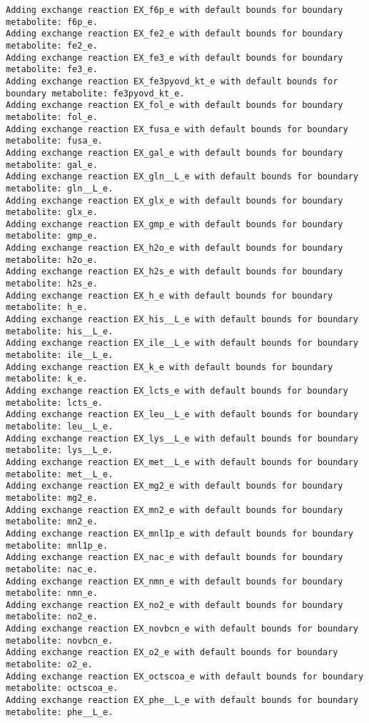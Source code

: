 \documentclass[
  letterpaper,
  DIV=11,
  numbers=noendperiod]{scrartcl}
\begin{document}
\begin{verbatim}
Adding exchange reaction EX_f6p_e with default bounds for boundary metabolite: f6p_e.
Adding exchange reaction EX_fe2_e with default bounds for boundary metabolite: fe2_e.
Adding exchange reaction EX_fe3_e with default bounds for boundary metabolite: fe3_e.
Adding exchange reaction EX_fe3pyovd_kt_e with default bounds for boundary metabolite: fe3pyovd_kt_e.
Adding exchange reaction EX_fol_e with default bounds for boundary metabolite: fol_e.
Adding exchange reaction EX_fusa_e with default bounds for boundary metabolite: fusa_e.
Adding exchange reaction EX_gal_e with default bounds for boundary metabolite: gal_e.
Adding exchange reaction EX_gln__L_e with default bounds for boundary metabolite: gln__L_e.
Adding exchange reaction EX_glx_e with default bounds for boundary metabolite: glx_e.
Adding exchange reaction EX_gmp_e with default bounds for boundary metabolite: gmp_e.
Adding exchange reaction EX_h2o_e with default bounds for boundary metabolite: h2o_e.
Adding exchange reaction EX_h2s_e with default bounds for boundary metabolite: h2s_e.
Adding exchange reaction EX_h_e with default bounds for boundary metabolite: h_e.
Adding exchange reaction EX_his__L_e with default bounds for boundary metabolite: his__L_e.
Adding exchange reaction EX_ile__L_e with default bounds for boundary metabolite: ile__L_e.
Adding exchange reaction EX_k_e with default bounds for boundary metabolite: k_e.
Adding exchange reaction EX_lcts_e with default bounds for boundary metabolite: lcts_e.
Adding exchange reaction EX_leu__L_e with default bounds for boundary metabolite: leu__L_e.
Adding exchange reaction EX_lys__L_e with default bounds for boundary metabolite: lys__L_e.
Adding exchange reaction EX_met__L_e with default bounds for boundary metabolite: met__L_e.
Adding exchange reaction EX_mg2_e with default bounds for boundary metabolite: mg2_e.
Adding exchange reaction EX_mn2_e with default bounds for boundary metabolite: mn2_e.
Adding exchange reaction EX_mnl1p_e with default bounds for boundary metabolite: mnl1p_e.
Adding exchange reaction EX_nac_e with default bounds for boundary metabolite: nac_e.
Adding exchange reaction EX_nmn_e with default bounds for boundary metabolite: nmn_e.
Adding exchange reaction EX_no2_e with default bounds for boundary metabolite: no2_e.
Adding exchange reaction EX_novbcn_e with default bounds for boundary metabolite: novbcn_e.
Adding exchange reaction EX_o2_e with default bounds for boundary metabolite: o2_e.
Adding exchange reaction EX_octscoa_e with default bounds for boundary metabolite: octscoa_e.
Adding exchange reaction EX_phe__L_e with default bounds for boundary metabolite: phe__L_e.

\end{verbatim}
\end{document}
